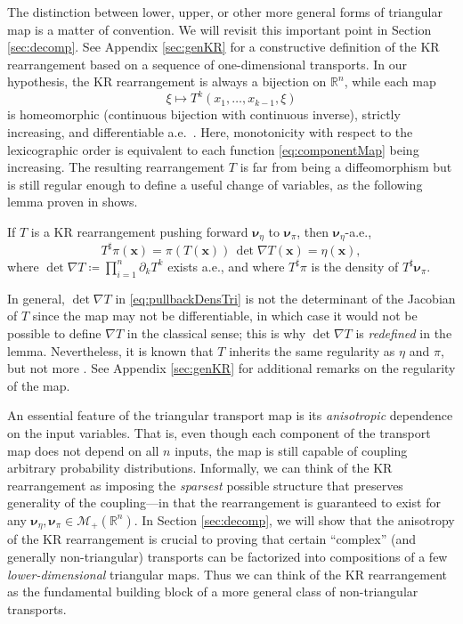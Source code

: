 \documentclass[twoside,11pt]{article}
\newcommand{\borelm}{\mathscr{M}}
\newcommand{\borelmp}{\borelm_+}
\newcommand{\genm}{\boldsymbol{\nu} }   %
\newcommand{\re}{\mathbb{R}}
\newcommand{\xb}{\boldsymbol{x}}
\newcommand{\pull}{^\sharp}
\begin{document}
%
%
%
%
The distinction between lower, upper, or other
more general forms of triangular map is a matter
of convention. We will revisit this important point
in Section \ref{sec:decomp}.
See Appendix \ref{sec:genKR} for a constructive definition of the KR
%
rearrangement based on a sequence of one-dimensional transports.
In our hypothesis, the KR rearrangement is always a bijection
on $\re^n$, while
each map %
\begin{equation} \label{eq:componentMap}
  \xi \mapsto T^k( x_1 ,\ldots, x_{k-1}, \xi )
\end{equation}
is
homeomorphic (continuous bijection with
continuous inverse), strictly increasing, and
differentiable 
%
a.e.\ \citep{santambrogio2015optimal}.
%
%
Here, monotonicity with respect to the lexicographic order is equivalent
to %
each function \eqref{eq:componentMap} being increasing.
%
%
%
%
%
%
%
%
%
%
%
%
%
%
The resulting rearrangement $T$ is far from
being a diffeomorphism but is still regular enough to
define a useful change of variables, as the following lemma
proven in \citet{bogachev2005triangular} shows.
%
\begin{lemma}\label{lem:changeVarTriWeak}
If $T$ is a KR rearrangement pushing forward  
$\genm_{\eta}$ to  $\genm_{\pi}$, then $\genm_{\eta}$-a.e., 
%
%
%
%
%
%
\begin{equation} \label{eq:pullbackDensTri}
  T\pull \pi(\xb) = \pi(T(\xb))\,\det \nabla T(\xb) = \eta(\xb),
\end{equation}
where $\det \nabla T \coloneqq \prod_{i=1}^n \partial_k T^k$ exists a.e., and
where $T\pull \pi$ is the density of $T\pull \genm_{\pi}$.
%
%
%
%
\end{lemma}
%
In general, $\det \nabla T$ in \eqref{eq:pullbackDensTri}  
is not the determinant of the
Jacobian of $T$ since the map may not be differentiable, in which case
it would not be possible to define
$\nabla T$ %
in the classical sense; this is
why $\det \nabla T$ is {\it redefined} in the lemma.
Nevertheless, it is  known that $T$ inherits the same
regularity as $\eta$ and $\pi$, but not more
\citep{santambrogio2015optimal}.
%
See Appendix \ref{sec:genKR} for additional remarks on the regularity of the map.
%
%
%
%
%
%
%
%
%
%

An essential feature of the triangular transport map is its {\it
  anisotropic} dependence on the input variables.  That is, even
though each component of the transport map does not depend on all $n$
inputs, the map is still capable of coupling arbitrary probability
distributions.  Informally, we can think of the KR
rearrangement as imposing the {\it sparsest} possible structure that
preserves generality of the coupling---in that the rearrangement is
guaranteed to exist for any 
$\genm_{\eta},\genm_{\pi} \in \borelmp(\re^n)$.
%
%
%
In Section \ref{sec:decomp}, we will show that the
anisotropy of the KR rearrangement is crucial to
proving that certain ``complex'' (and generally non-triangular)
transports can be factorized into compositions of a few
\textit{lower-dimensional} {triangular} maps.  Thus we can think of the
KR rearrangement as the fundamental building block of a more general
class of non-triangular transports.
\end{document}
